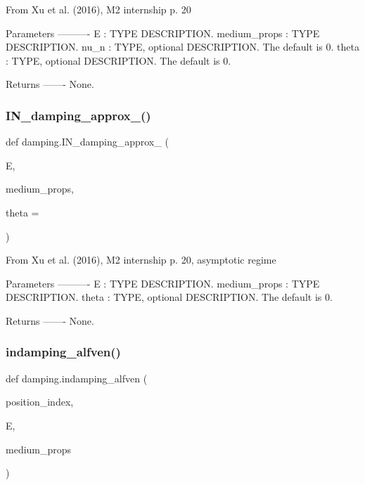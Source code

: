\begin{DoxyVerb}From Xu et al. (2016), M2 internship p. 20

Parameters
----------
E : TYPE
    DESCRIPTION.
medium_props : TYPE
    DESCRIPTION.
nu_n : TYPE, optional
    DESCRIPTION. The default is 0.
theta : TYPE, optional
    DESCRIPTION. The default is 0.

Returns
-------
None.\end{DoxyVerb}
 \mbox{\label{namespacedamping_a63e78eb4bbbff1705852a5380075b2c3}} 
\subsubsection{\texorpdfstring{I\+N\+\_\+damping\+\_\+approx\+\_()}{IN\_damping\_approx\_2()}}
{\footnotesize\ttfamily def damping.\+I\+N\+\_\+damping\+\_\+approx\+\_ (\begin{DoxyParamCaption}\item[{}]{E,  }\item[{}]{medium\+\_\+props,  }\item[{}]{theta = {} }\end{DoxyParamCaption})}

\begin{DoxyVerb}From Xu et al. (2016), M2 internship p. 20, asymptotic regime

Parameters
----------
E : TYPE
    DESCRIPTION.
medium_props : TYPE
    DESCRIPTION.
theta : TYPE, optional
    DESCRIPTION. The default is 0.

Returns
-------
None.\end{DoxyVerb}
 \mbox{\label{namespacedamping_ae5e90342015eca66db1d0a218504b25c}} 
\subsubsection{\texorpdfstring{indamping\+\_\+alfven()}{indamping\_alfven()}}
{\footnotesize\ttfamily def damping.\+indamping\+\_\+alfven (\begin{DoxyParamCaption}\item[{}]{position\+\_\+index,  }\item[{}]{E,  }\item[{}]{medium\+\_\+props }\end{DoxyParamCaption})}

